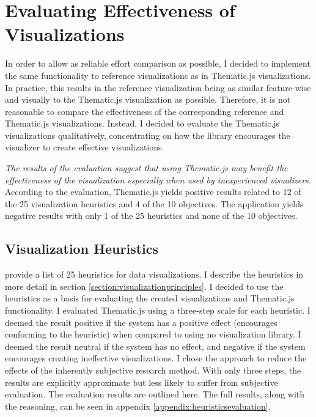 \section{Evaluating Effectiveness of Visualizations}
\label{section:evaluatingeffectiveness}

In order to allow as reliable effort comparison as possible, I decided to implement the same functionality to reference visualizations as in Thematic.js visualizations. In practice, this results in the reference visualization being as similar feature-wise and visually to the Thematic.js visualization as possible. Therefore, it is not reasonable to compare the effectiveness of the corresponding reference and Thematic.js visualizations. Instead, I decided to evaluate the Thematic.js visualizations qualitatively, concentrating on how the library encourages the visualizer to create effective visualizations.

\emph{The results of the evaluation suggest that using Thematic.js may benefit the effectiveness of the visualization especially when used by inexperienced visualizers.} According to the evaluation, Thematic.js yields positive results related to 12 of the 25 visualization heuristics and 4 of the 10 objectives. The application yields negative results with only 1 of the 25 heuristics and none of the 10 objectives.

\subsection{Visualization Heuristics}

\citet{zuk_heuristics_2006} provide a list of 25 heuristics for data visualizations. I describe the heuristics in more detail in section \ref{section:visualizationprinciples}. I decided to use the heuristics as a basis for evaluating the created visualizations and Thematic.js functionality. I evaluated Thematic.js using a three-step scale for each heuristic. I deemed the result positive if the system has a positive effect (encourages conforming to the heuristic) when compared to using no visualization library. I deemed the result neutral if the system has no effect, and negative if the system encourages creating ineffective visualizations. I chose the approach to reduce the effects of the inherently subjective research method. With only three steps, the results are explicitly approximate but less likely to suffer from subjective evaluation. The evaluation results are outlined here. The full results, along with the reasoning, can be seen in appendix \ref{appendix:heuristicsevaluation}.

